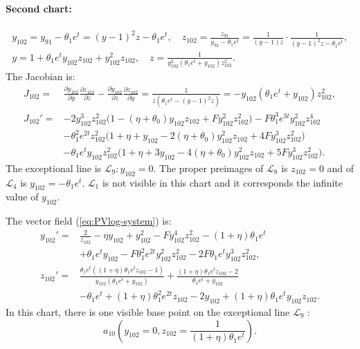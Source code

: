 \paragraph{Second chart:}
\begin{gather*}
y_{102}=y_{91}-\theta_1 e^t=(y-1)^2z-\theta_1 e^t,
\quad
z_{102}=\frac{z_{91}}{y_{91}-\theta_1 e^t}=\frac{1}{(y-1)z}\cdot\frac{1}{(y-1)^2z-\theta_1 e^t}
,
\\
y= 1 + \theta_1 e^t y_{102} z_{102} + y_{102}^2 z_{102},
\quad
z=\frac{1}{y_{102}^2 (\theta_1 e^t + y_{102}) z_{102}^2}.
\end{gather*}
The Jacobian is:
$$
\begin{aligned}
J_{102}=&\frac{\partial y_{102}}{\partial y}\frac{\partial z_{102}}{\partial z}-\frac{\partial y_{102}}{\partial z}\frac{\partial z_{102}}{\partial y}
=\frac{1}{z (\theta_1 e^t - ( y-1)^2 z)}
=-y_{102} (\theta_1 e^t + y_{102}) z_{102}^2,
\\
J_{102}'=&
-2 y_{102}^3 z_{102}^2\big(
1- (\eta  +  \theta_0) y_{102} z_{102} 
+  F y_{102}^2 z_{102}^2 
\big)
- 
 F \theta_1^3 e^{3t}  y_{102}^2 z_{102}^4 
\\& 
 - \theta_1^2  e^{2t} z_{102}^2 \big(1+ \eta +y_{102}-   2 (\eta + \theta_0)  y_{102}^2 z_{102} 
 +   4 F  y_{102}^3 z_{102}^2\big) 
\\& 
 -
\theta_1 e^{t} y_{102} z_{102}^2  \big(1 + \eta +   3  y_{102} - 4 (\eta+\theta_0)  y_{102}^2 z_{102} + 5 F  y_{102}^3 z_{102}^2\big).
\end{aligned}
$$
The exceptional line is $\mathcal{L}_9 : y_{102}=0$.
The proper preimages of $\mathcal{L}_{8}$ is $z_{102}=0$ and of $\mathcal{L}_4$ is $y_{102}=-\theta_1 e^t$.
 $\mathcal{L}_1$ is not visible in this chart and it corresponds the infinite value of $y_{102}$.


The vector field  (\ref{eq:PVlog-system}) is:
$$
\begin{aligned}
y_{102}'=&
\frac{2}{z_{102}}
-\eta y_{102} + y_{102}^2  - F y_{102}^4 z_{102}^2
-(1+ \eta) \theta_1 e^t  
\\&
+ \theta_1 e^t  y_{102} - 
F \theta_1^2 e^{2t}  y_{102}^2 z_{102}^2 - 2 F \theta_1 e^t  y_{102}^3 z_{102}^2
,
\\
z_{102}'=&
\frac{\theta_1 e^t ((1 + \eta) \theta_1 e^t z_{102}-1)}{y_{102} (\theta_1 e^t + y_{102})}
+\frac{ (1+\eta) \theta_1 e^t z_{102}-2}{\theta_1 e^t + y_{102}}
\\&
-\theta_1 e^t + (1+\eta)\theta_1^2 e^{2t}  z_{102}  -2y_{102}
   + (1+ \eta )\theta_1 e^t y_{102}z_{102}
.
\end{aligned}
$$
In this chart, there is one visible base point on the exceptional line $\mathcal{L}_9$ : 
$$a_{10} \left( y_{102}=0,z_{102}=\frac{1}{(1 + \eta)\theta_1  e^t}\right).$$

